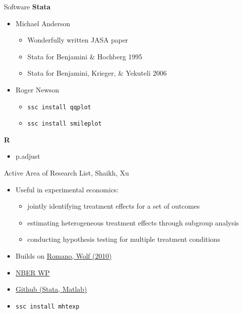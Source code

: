 \documentclass{beamer}
\begin{document}
\begin{frame}{Software}
\textbf{Stata}
\begin{itemize}
\item Michael Anderson
\begin{itemize}
\item Wonderfully written JASA paper \href{https://are.berkeley.edu/~mlanderson/pdf/Anderson\%202008a.pdf}{}
\item Stata for Benjamini \& Hochberg 1995 \href{http://are.berkeley.edu/~mlanderson/downloads/fdr_qvalues.do.zip}{}
\item Stata for Benjamini, Krieger, \& Yekuteli 2006 \href{http://are.berkeley.edu/~mlanderson/downloads/fdr\_sharpened\_qvalues.do.zip}{}
\end{itemize}
\item Roger Newson
\begin{itemize}
\item \texttt{ssc install qqplot} \href{http://www.stata-journal.com/sjpdf.html?articlenum=st0209}{}
\item \texttt{ssc install smileplot} \href{http://www.stata-journal.com/sjpdf.html?articlenum=st0035}{}
\end{itemize}
\end{itemize}
\textbf{R}
\begin{itemize}
\item p.adjust \href{https://www.rdocumentation.org/packages/stats/versions/3.4.3/topics/p.adjust}{}
\end{itemize}
\end{frame}

\begin{frame}{Active Area of Research}
List, Shaikh, Xu
\begin{itemize}
\item Useful in experimental economics:
\begin{itemize}
\item jointly identifying treatment effects for a set of outcomes
\item estimating heterogeneous treatment effects through subgroup analysis
\item conducting hypothesis testing for multiple treatment conditions
\end{itemize}
\item Builds on \href{https://projecteuclid.org/download/pdfview_1/euclid.aos/1262271625}{Romano, Wolf (2010)}
\item \href{http://www.nber.org/papers/w21875}{NBER WP}
\item \href{https://github.com/seidelj/mht}{Github (Stata, Matlab)}
\item \texttt{ssc install mhtexp}
\end{itemize}
\end{frame}
\end{document}
